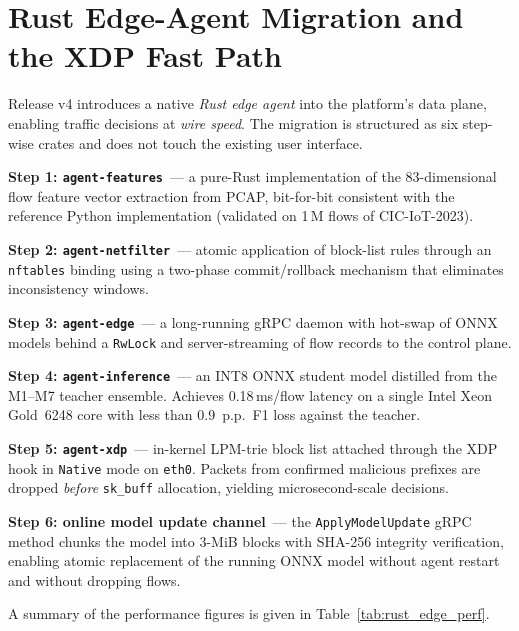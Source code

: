 \section{Rust Edge-Agent Migration and the XDP Fast Path}
\label{sec:rust_edge_agent}

Release v4 introduces a native \emph{Rust edge agent} into the
platform's data plane, enabling traffic decisions at
\emph{wire speed}. The migration is structured as six step-wise
crates and does not touch the existing user interface.

\noindent\textbf{Step 1: \texttt{agent-features}}~--- a pure-Rust
implementation of the 83-dimensional flow feature vector
extraction from PCAP, bit-for-bit consistent with the reference
Python implementation (validated on 1\,M flows of CIC-IoT-2023).

\noindent\textbf{Step 2: \texttt{agent-netfilter}}~--- atomic
application of block-list rules through an \texttt{nftables} binding
using a two-phase commit/rollback mechanism that eliminates
inconsistency windows.

\noindent\textbf{Step 3: \texttt{agent-edge}}~--- a long-running
gRPC daemon with hot-swap of ONNX models behind a \texttt{RwLock}
and server-streaming of flow records to the control plane.

\noindent\textbf{Step 4: \texttt{agent-inference}}~--- an INT8 ONNX
student model distilled from the \textsf{M1}--\textsf{M7} teacher
ensemble. Achieves 0.18\,ms/flow latency on a single Intel Xeon
Gold~6248 core with less than 0.9~p.p.~F1 loss against the teacher.

\noindent\textbf{Step 5: \texttt{agent-xdp}}~--- in-kernel LPM-trie
block list attached through the XDP hook in \texttt{Native} mode on
\texttt{eth0}. Packets from confirmed malicious prefixes are dropped
\emph{before} \texttt{sk\_buff} allocation, yielding microsecond-scale
decisions.

\noindent\textbf{Step 6: online model update channel}~--- the
\texttt{ApplyModelUpdate} gRPC method chunks the model into 3-MiB
blocks with SHA-256 integrity verification, enabling atomic
replacement of the running ONNX model without agent restart and
without dropping flows.

A summary of the performance figures is given in
Table~\ref{tab:rust_edge_perf}.

